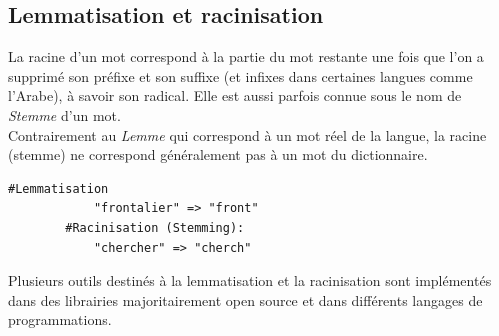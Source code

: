     \subsection{Lemmatisation et racinisation}
    La racine d'un mot correspond à la partie du mot restante une fois que l'on a supprimé son préfixe et son suffixe (et infixes dans certaines langues comme l'Arabe), à savoir son radical. Elle est aussi parfois connue sous le nom de \emph{Stemme} d'un mot.\\ 
    Contrairement au \emph{Lemme} qui correspond à un mot réel de la langue, la racine (stemme) ne correspond généralement pas à un mot du dictionnaire.
    \begin{lstlisting}[style=code]
        #Lemmatisation 
            "frontalier" => "front"  
        #Racinisation (Stemming):
            "chercher" => "cherch"
    \end{lstlisting}
    Plusieurs outils destinés à la lemmatisation et la racinisation sont implémentés dans des librairies majoritairement open source et dans différents langages de programmations.

